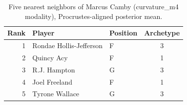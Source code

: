 \begin{table}[htbp]
  \centering\small
  \begin{tabular}{rllc}
    \toprule
    Rank & Player & Position & Archetype \\
    \midrule
    1 & Rondae Hollis-Jefferson & F & 3 \\
    2 & Quincy Acy & F & 1 \\
    3 & R.J. Hampton & G & 3 \\
    4 & Joel Freeland & F & 1 \\
    5 & Tyrone Wallace & G & 3 \\
    \bottomrule
  \end{tabular}
  \caption{Five nearest neighbors of Marcus Camby (curvature_m4 modality), Procrustes-aligned posterior mean.}
  \label{tab:Marcus_Camby_neighbors_curvature_m4}
\end{table}

